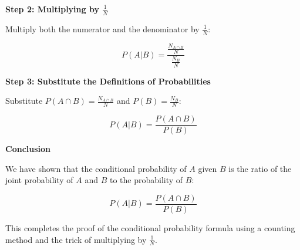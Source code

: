 \documentclass{article}
\begin{document}
\textbf{Step 2: Multiplying by \( \frac{1}{N} \)}

Multiply both the numerator and the denominator by \( \frac{1}{N} \):

\[
P(A|B) = \frac{\frac{N_{A \cap B}}{N}}{\frac{N_B}{N}}
\]

\textbf{Step 3: Substitute the Definitions of Probabilities}

Substitute \( P(A \cap B) = \frac{N_{A \cap B}}{N} \) and \( P(B) = \frac{N_B}{N} \):

\[
P(A|B) = \frac{P(A \cap B)}{P(B)}
\]

\textbf{Conclusion}

We have shown that the conditional probability of \( A \) given \( B \) is the ratio of the joint probability of \( A \) and \( B \) to the probability of \( B \):

\[
P(A|B) = \frac{P(A \cap B)}{P(B)}
\]

This completes the proof of the conditional probability formula using a counting method and the trick of multiplying by \( \frac{1}{N} \).
\end{document}
